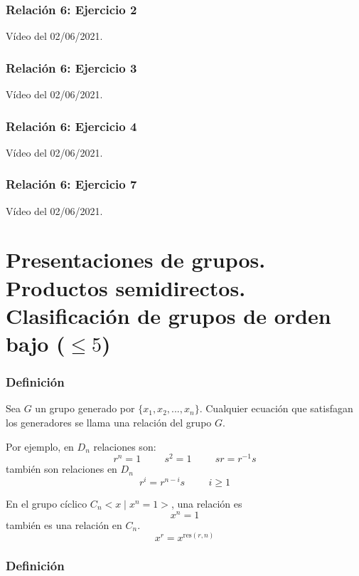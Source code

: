 \documentclass[11pt,a4paper]{article}
\begin{document}
\subsubsection*{Relación 6: Ejercicio 2}

Vídeo del 02/06/2021.

\subsubsection*{Relación 6: Ejercicio 3}

Vídeo del 02/06/2021.

\subsubsection*{Relación 6: Ejercicio 4}

Vídeo del 02/06/2021.

\subsubsection*{Relación 6: Ejercicio 7}

Vídeo del 02/06/2021.

\newpage


\section{Presentaciones de grupos. Productos semidirectos. Clasificación de grupos de orden bajo ($\leq 5$)}

\subsubsection*{Definición}

Sea $G$ un grupo generado por $\{x_{1}, x_{2}, ..., x_{n}\}$. Cualquier ecuación que satisfagan los generadores se llama una relación del grupo $G$.

Por ejemplo, en $D_{n}$ relaciones son:
$$r^{n} = 1 \hspace{1cm} s^{2} = 1 \hspace{1cm} sr=r^{-1}s$$
también son relaciones en $D_{n}$
$$r^{i} = r^{n-i}s \hspace{1cm} i \geq 1$$

En el grupo cíclico $C_{n} <x \mid x^{n} = 1>$, una relación es
$$x^{n} = 1$$
también es una relación en $C_{n}$.
$$x^{r} = x^{\text{res}(r,n)}$$

\subsubsection*{Definición}
\end{document}
